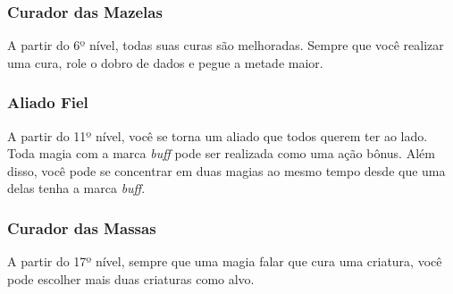 \begin{multicols}{2}
\subsubsection*{Curador das Mazelas}%

A partir do 6º nível, todas suas curas são melhoradas. Sempre que você realizar
uma cura, role o dobro de dados e pegue a metade maior.

\subsubsection*{Aliado Fiel}%

A partir do 11º nível, você se torna um aliado que todos querem ter ao lado.
Toda magia com a marca \textit{buff} pode ser realizada como uma ação bônus.
Além disso, você pode se concentrar em duas magias ao mesmo tempo desde que uma
delas tenha a marca \textit{buff}.

\subsubsection*{Curador das Massas}%

A partir do 17º nível, sempre que uma magia falar que cura uma criatura, você
pode escolher mais duas criaturas como alvo.

\end{multicols}
